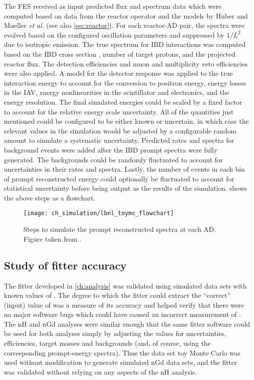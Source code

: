 The FES received as input predicted \nuebar{} flux and spectrum data
which were computed \cite{christine_reactor} based on data from the reactor operator
and the models by Huber \cite{reactor_huber}
and Mueller \emph{et al.} \cite{reactor_mueller} (see also \cref{sec:reactor}).
For each reactor-AD pair, the spectra were evolved
based on the configured oscillation parameters
and suppressed by $1/L^2$ due to isotropic emission.
The true \nuebar{} spectrum for IBD interactions was computed
based on the IBD cross section \cite{ibd_xsec,ibd_xsec_note},
number of target protons, and the projected reactor flux.
The detection efficiencies and muon and multiplicity veto efficiencies
were also applied.
A model for the detector response was applied to the true interaction energy
to account for the conversion to positron energy,
energy losses in the IAV,
energy nonlinearities in the scintillator and electronics,
and the energy resolution.
The final simulated energies could be scaled by a fixed factor
to account for the relative energy scale uncertainty.
All of the quantities just mentioned could be configured
to be either known or uncertain, in which case
the relevant values in the simulation would be
adjusted by a configurable random amount
to simulate a systematic uncertainty.
Predicted rates and spectra for background events
were added after the IBD prompt spectra were fully generated.
The backgrounds could be randomly fluctuated to account for
uncertainties in their rates and spectra.
Lastly, the number of events in each bin of prompt reconstructed energy
could optionally be fluctuated to account for statistical uncertainty
before being output as the results of the simulation.
 shows the above steps as a flowchart.

\begin{figure}
    \centering
    \texttt{[image: ch\_simulation/lbnl\_toymc\_flowchart]}
    \caption[Fake Experiment Simulation flowchart]{
        Steps to simulate the prompt reconstructed spectra
        at each AD.
        Figure taken from \cite{lbnl_toymc}.
    }
    \label{fig:lbnl_toymc_flowchart}
\end{figure}

\subsection{Study of fitter accuracy}
\label{subsec:fitter_validation}

The fitter developed in \cref{ch:analysis} was validated
using simulated data sets with known values of \thetaot{}.
The degree to which the fitter could extract
the ``correct'' (input) value of \thetaot{}
was a measure of its accuracy
and helped verify that there were no major software bugs
which could have caused an incorrect measurement of \thetaot{}.
The nH and nGd analyses were similar enough
that the same fitter software could be used for both analyses
simply by adjusting the values for uncertainties, efficiencies,
target masses and backgrounds
(and, of course, using the corresponding prompt-energy spectra).
Thus the data set toy Monte Carlo was used without modification
to generate simulated nGd data sets,
and the fitter was validated without relying on
any aspects of the nH analysis.

